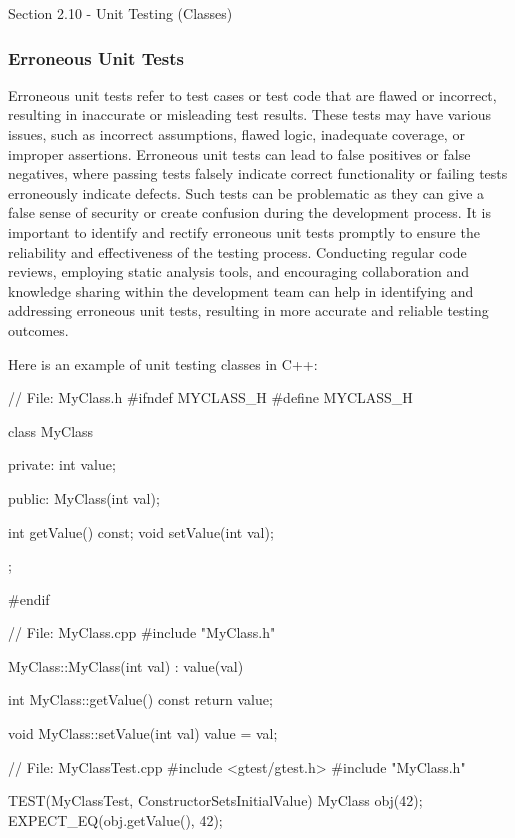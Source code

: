 \begin{notes}{Section 2.10 - Unit Testing (Classes)}
    \subsubsection*{Erroneous Unit Tests}
    
    Erroneous unit tests refer to test cases or test code that are flawed or incorrect, resulting in inaccurate or misleading test results. These tests may have various issues, such as incorrect assumptions, flawed logic, inadequate coverage, or improper assertions. Erroneous 
    unit tests can lead to false positives or false negatives, where passing tests falsely indicate correct functionality or failing tests erroneously indicate defects. Such tests can be problematic as they can give a false sense of security or create confusion during the development 
    process. It is important to identify and rectify erroneous unit tests promptly to ensure the reliability and effectiveness of the testing process. Conducting regular code reviews, employing static analysis tools, and encouraging collaboration and knowledge sharing within the 
    development team can help in identifying and addressing erroneous unit tests, resulting in more accurate and reliable testing outcomes.
    
    \begin{highlight}
        Here is an example of unit testing classes in C++:
    \begin{code}[C++]
    // File: MyClass.h
    #ifndef MYCLASS_H
    #define MYCLASS_H
    
    class MyClass {
    private:
        int value;
    
    public:
        MyClass(int val);
    
        int getValue() const;
        void setValue(int val);
    };
    
    #endif
    
    // File: MyClass.cpp
    #include "MyClass.h"
    
    MyClass::MyClass(int val) : value(val) {}
    
    int MyClass::getValue() const {
        return value;
    }
    
    void MyClass::setValue(int val) {
        value = val;
    }
    
    // File: MyClassTest.cpp
    #include <gtest/gtest.h>
    #include "MyClass.h"
    
    TEST(MyClassTest, ConstructorSetsInitialValue) {
        MyClass obj(42);
        EXPECT_EQ(obj.getValue(), 42);
    }
    

\end{code}
\end{highlight}
\end{notes}

